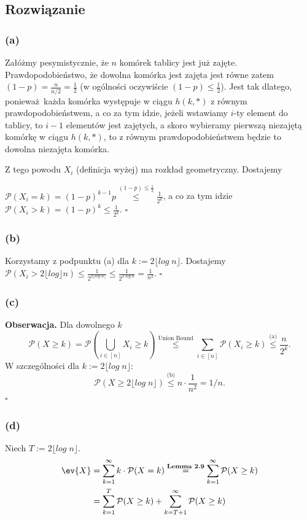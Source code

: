 \subsection*{Rozwiązanie}
\subsubsection*{(a)}
Załóżmy pesymistycznie, że \(n\) komórek tablicy jest już zajęte. Prawdopodobieństwo, że dowolna komórka jest zajęta jest równe zatem \((1-p) = \frac{n}{n/2} = \frac{1}{2}\) (w ogólności oczywiście \((1-p) \le \frac{1}{2}\)). Jest tak dlatego, ponieważ każda komórka występuje w ciągu \(h(k, *)\) z równym prawdopodobieństwem, a co za tym idzie, jeżeli wstawiamy \(i\)-ty element do tablicy, to \(i-1\) elementów jest zajętych, a skoro wybieramy pierwszą niezajętą komórkę w ciągu \(h(k, *)\), to z równym prawdopodobieństwem będzie to dowolna niezajęta komórka.

Z tego powodu \(X_i\) (definicja wyżej) ma rozkład geometryczny. Dostajemy

\(\mathcal{P}(X_i = k) = (1-p)^{k-1}p \overset{(1-p) \le \frac{1}{2}}{\le} \frac{1}{2^k}\), a co za tym idzie \(\mathcal{P}(X_i > k) = (1-p)^k \le \frac{1}{2^k}\). \hfill \(\square\)

\subsubsection*{(b)}
Korzystamy z podpunktu (a) dla \(k := 2 \lfloor log \; n \rfloor\). Dostajemy \(\mathcal{P}(X_i > 2 \lfloor log \rfloor n) \le \frac{1}{2^{2 \lfloor log \; n \rfloor }} \le \frac{1}{2^{2 \; log \; n}} = \frac{1}{n^2}\). \hfill \(\square\)

\subsubsection*{(c)}
\textbf{Obserwacja.} Dla dowolnego \(k\)
\[
	\mathcal{P}(X \ge k) = \mathcal{P}(\bigcup_{i \in [n]} X_i \ge k) \overset{\text{Union Bound}}{\le} \sum_{i \in [n]} \mathcal{P}(X_i \ge k) \overset{\text{(a)}}{\le} \frac{n}{2^k}.
\]
W szczególności dla \(k := 2 \lfloor log \; n \rfloor\):
\[
	\mathcal{P}(X \ge 2 \lfloor log \; n \rfloor) \overset{\text{(b)}}{\le} n \cdot \frac{1}{n^2} = 1/n.
\]
\hfill \(\square\)

\subsubsection*{(d)}
Niech \(T := 2 \lfloor log \; n \rfloor\).
\begin{align*}
	\ev{X} & = \sum_{k=1}^\infty k \cdot \mathcal{P}(X = k) \overset{\textbf{Lemma 2.9}}{=} \sum_{k = 1}^\infty \mathcal{P}(X \ge k) \\
	       & = \sum_{k=1}^T \mathcal{P}(X \ge k) + \sum_{k=T+1}^\infty \mathcal{P}(X \ge k)
\end{align*}

